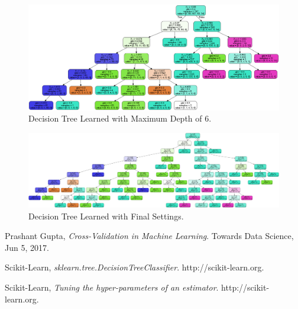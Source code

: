 \documentclass[12pt]{article}
\numberwithin{equation}{section}
\numberwithin{table}{section}
\numberwithin{figure}{section}
\begin{document}
\begin{figure}
	\includegraphics[width=\textwidth]{dt_max_depth_6.png}
	\caption{Decision Tree Learned with Maximum Depth of 6.}
	\label{fig:max_width}
\end{figure}

\begin{figure}
	\includegraphics[width=\textwidth]{dt_extra_1.png}
	\caption{Decision Tree Learned with Final Settings.}
	\label{fig:max_width}
\end{figure}
\newpage
\begin{thebibliography}{999}
	
	Prashant Gupta,
	\emph{Cross-Validation in Machine Learning}.
	Towards Data Science,
	Jun 5, 2017.
	
	Scikit-Learn,
	\emph{sklearn.tree.DecisionTreeClassifier}.
	http://scikit-learn.org.
	
	Scikit-Learn,
	\emph{Tuning the hyper-parameters of an estimator}.
	http://scikit-learn.org.
	
\end{thebibliography}
\end{document}
